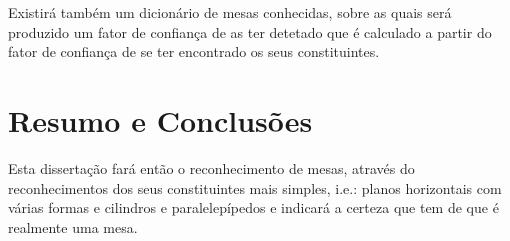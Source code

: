 Existirá também um dicionário de mesas conhecidas, sobre as quais será produzido um fator de confiança de as ter detetado que é calculado a partir do fator de confiança de se ter encontrado os seus constituintes.



\section{Resumo e Conclusões}

Esta dissertação fará então o reconhecimento de mesas, através do reconhecimentos dos seus constituintes mais simples, i.e.: planos horizontais com várias formas e cilindros e paralelepípedos e indicará a certeza que tem de que é realmente uma mesa.